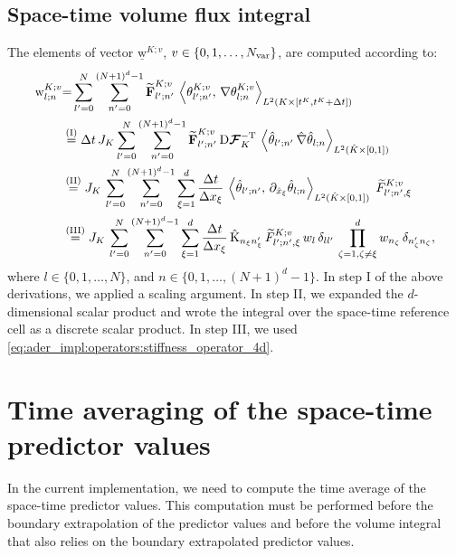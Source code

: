 \documentclass{scrreprt}
\theoremstyle{definition}
\theoremstyle{nonumberplain}
\renewcommand{\vec}[1]{{\textbf{#1}}}
\newcommand{\stvec}[1]{\widetilde{\vec{#1}}}
\newcommand{\laVec}[1]{\underline{\mathrm{#1}}}
\newcommand{\laVecel}[1]{\mathrm{#1}}
\newcommand{\laMatel}[1]{\mathrm{#1}}
\newcommand{\cell}{K}
\newcommand{\dt}{\textup{d}t}
\newcommand{\dV}{\text{d}\vec{x}}
\newcommand{\refVec}[1]{\hat{\vec{#1}}}
\newcommand{\refCell}{\hat{\cell}}
\newcommand{\jacobian}{\textup{D}\boldsymbol{\mathcal{F}}_{\cell}}
\newcommand{\detJ}{J_\cell}
\newcommand{\refdV}{\textup{d}\hat{\vec{x}}}
\newcommand{\refdt}{\textup{d}\hat{t}}
\begin{document}
\subsection{Space-time volume flux integral}
\label{sec:ader_impl:predictor:space_time_volume_flux_integral}
The elements of vector $\laVec{w}^{\cell;v}$,
$v\in\{0,1,\ldots,N_\textup{var}\}$, are computed according to:
\begin{align}
\laVecel{w}^{\cell;v}_{l;n}
&{=}
\sum_{l'=0}^{N}
\sum_{n'=0}^{(N+1)^d-1}
\stvec{F}^{K;v}_{l';n'}\,
\left\langle
\theta^{K;v}_{l';n'},\,
\nabla
\theta^{K;v}_{l;n}
\right\rangle
_{L^2(\cell\times[t^\cell,t^\cell+\Delta t])}
\notag
\\
&\overset{(\textup{I})}
{=}
\Delta t\,
\detJ
\sum_{l'=0}^{N}
\sum_{n'=0}^{(N+1)^d-1}
\stvec{F}^{K;v}_{l';n'}\,
\jacobian^{-\textup{T}}\,
\left\langle
\hat{\theta}_{l';n'}\,
\hat{\nabla}
\hat{\theta}_{l;n}
\right\rangle
_{L^2(\refCell\times[0,1])}
\notag
\\
&\overset{(\textup{II})}
{=}
\detJ\,
\sum_{l'=0}^{N}
\sum_{n'=0}^{(N+1)^d-1}
\sum_{\xi=1}^d
\frac{\Delta t}{\Delta x_{\xi}}\,
\left\langle
\hat{\theta}_{l';n'},\,
\partial_{\hat{x}_\xi}\hat{\theta}_{l;n}
\right\rangle
_{L^2(\refCell\times[0,1])}
\;\widetilde{F}^{\cell;v}_{l';n',\xi}
\notag
\\
&\overset{(\textup{III})}
{=}
\detJ\,
\sum_{l'=0}^{N}
\sum_{n'=0}^{(N+1)^d-1}
\sum_{\xi =1}^d
\frac{\Delta t}{\Delta x_{\xi}}\,
\laMatel{\hat{K}}_{n_\xi n'_\xi}\,
\widetilde{F}^{\cell;v}_{l';n',\xi}\,
w_{l}\,
\delta_{ll'}\,
\prod_{\zeta=1,\zeta\neq\xi}^d
w_{n_\zeta}\,
\delta_{n'_\zeta n_\zeta},
\end{align}
where $l\in\{0,1,\ldots,N\}$, and
$n\in\{0,1,\ldots,(N+1)^{d}-1\}$.
In step I of the above derivations, we applied a scaling argument.
In step II, we expanded the $d$-dimensional scalar
product and wrote the integral over the space-time reference cell as a
discrete scalar product.
In step III, we used \eqref{eq:ader_impl:operators:stiffness_operator_4d}.

\section{Time averaging of the space-time predictor values}
In the current implementation, we need to compute the time average of the
space-time predictor values.
This computation must be performed before the boundary extrapolation of
the predictor values and before the volume integral that also
relies on the boundary extrapolated predictor values.
\end{document}
